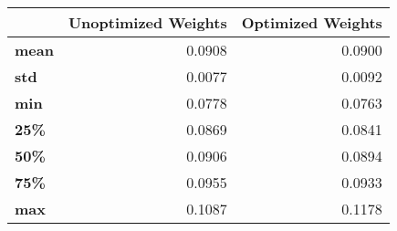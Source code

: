 \begin{tabular}{lrr}
\toprule
{} &  Unoptimized Weights &  Optimized Weights \\
\midrule
\textbf{mean} &               0.0908 &             0.0900 \\
\textbf{std } &               0.0077 &             0.0092 \\
\textbf{min } &               0.0778 &             0.0763 \\
\textbf{25\% } &               0.0869 &             0.0841 \\
\textbf{50\% } &               0.0906 &             0.0894 \\
\textbf{75\% } &               0.0955 &             0.0933 \\
\textbf{max } &               0.1087 &             0.1178 \\
\bottomrule
\end{tabular}
